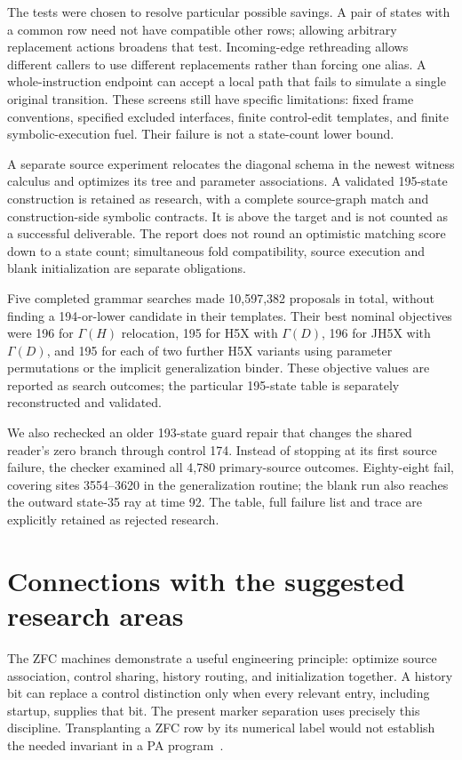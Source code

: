 \documentclass[11pt,letterpaper]{article}
\begin{document}
The tests were chosen to resolve particular possible savings. A pair of
states with a common row need not have compatible other rows; allowing
arbitrary replacement actions broadens that test. Incoming-edge rethreading
allows different callers to use different replacements rather than forcing
one alias. A whole-instruction endpoint can accept a local path that fails
to simulate a single original transition. These screens still have specific
limitations: fixed frame conventions, specified excluded interfaces, finite
control-edit templates, and finite symbolic-execution fuel. Their failure
is not a state-count lower bound.

A separate source experiment relocates the diagonal schema in the newest
witness calculus and optimizes its tree and parameter associations. A
validated 195-state construction is retained as research, with a complete
source-graph match and construction-side symbolic contracts. It is above
the target and is not counted as a successful deliverable. The report does
not round an optimistic matching score down to a state count; simultaneous
fold compatibility, source execution and blank initialization are separate
obligations.

Five completed grammar searches made 10,597,382 proposals in total, without
finding a 194-or-lower candidate in their templates. Their best nominal
objectives were 196 for $\Gamma(H)$ relocation, 195 for H5X with
$\Gamma(D)$, 196 for JH5X with $\Gamma(D)$, and 195 for each of two further
H5X variants using parameter permutations or the implicit generalization
binder. These objective values are reported as search outcomes; the
particular 195-state table is separately reconstructed and validated.

We also rechecked an older 193-state guard repair that changes the shared
reader's zero branch through control 174. Instead of stopping at its first
source failure, the checker examined all 4,780 primary-source outcomes.
Eighty-eight fail, covering sites 3554--3620 in the generalization routine;
the blank run also reaches the outward state-35 ray at time 92. The table,
full failure list and trace are explicitly retained as rejected research.

\section{Connections with the suggested research areas}
\label{sec:related}
The ZFC machines demonstrate a useful engineering principle: optimize source
association, control sharing, history routing, and initialization together.
A history bit can replace a control distinction only when every relevant
entry, including startup, supplies that bit. The present marker separation
uses precisely this discipline. Transplanting a ZFC row by its numerical
label would not establish the needed invariant in a PA program~\cite{zfc}.
\end{document}
